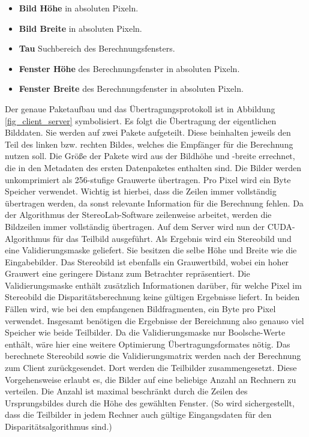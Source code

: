 \documentclass[conference]{IEEEtran}
\begin{document}
\begin{itemize}
\item \textbf{Bild Höhe} in absoluten Pixeln.
\item \textbf{Bild Breite} in absoluten Pixeln.
\item \textbf{Tau} Suchbereich des Berechnungsfensters.
\item \textbf{Fenster Höhe} des Berechnungsfenster in absoluten Pixeln.
\item \textbf{Fenster Breite} des Berechnungsfenster in absoluten Pixeln.
\end{itemize}


Der genaue Paketaufbau und das Übertragungsprotokoll ist in Abbildung \ref{fig_client_server} symbolisiert. Es folgt die Übertragung der eigentlichen Bilddaten. Sie werden auf zwei Pakete aufgeteilt. Diese beinhalten jeweils den Teil des linken bzw. rechten Bildes, welches die Empfänger für die Berechnung nutzen soll. Die Größe der Pakete wird aus der Bildhöhe und -breite errechnet, die in den Metadaten des ersten Datenpaketes enthalten sind. Die Bilder werden unkomprimiert als 256-stufige Grauwerte übertragen. Pro Pixel wird ein Byte Speicher verwendet.
 Wichtig ist hierbei, dass die Zeilen immer vollständig übertragen werden, da sonst relevante Information für die Berechnung fehlen.
Da der Algorithmus der StereoLab-Software zeilenweise arbeitet, werden die Bildzeilen immer vollständig übertragen. %
Auf dem Server wird nun der CUDA-Algorithmus für das Teilbild ausgeführt. Als Ergebnis wird ein Stereobild und eine Validierungsmaske geliefert. Sie besitzen die selbe Höhe und Breite wie die Eingabebilder. Das Stereobild ist ebenfalls ein Grauwertbild, wobei ein hoher Grauwert eine geringere Distanz zum Betrachter repräsentiert. Die Validierungsmaske enthält zusätzlich Informationen darüber, für welche Pixel im Stereobild die Disparitätsberechnung keine gültigen Ergebnisse liefert. In beiden Fällen wird, wie bei den empfangenen Bildfragmenten, ein Byte pro Pixel verwendet. Insgesamt benötigen die Ergebnisse der Bereichnung also genauso viel Speicher wie beide Teilbilder.  Da die Validierungsmaske nur Boolsche-Werte enthält, wäre hier eine weitere Optimierung Übertragungsformates nötig. %
Das berechnete Stereobild sowie die Validierungsmatrix werden nach der Berechnung zum Client zurückgesendet. Dort werden die Teilbilder zusammengesetzt. Diese Vorgehensweise erlaubt es, die Bilder auf eine beliebige Anzahl an Rechnern zu verteilen. Die Anzahl ist maximal beschränkt durch die Zeilen des Ursprungsbildes durch die Höhe des gewählten Fenster. (So wird sichergestellt, dass die Teilbilder in jedem Rechner auch gültige Eingangsdaten für den Disparitätsalgorithmus sind.) %
\end{document}

